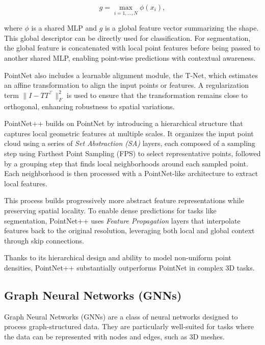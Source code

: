 \documentclass[%
 reprint,
 amsmath,amssymb,
 aps,
 floatfix,
 nofootinbib,
]{revtex4-2}
\begin{document}
\vspace{-0.35cm}

\[
g = \max_{i=1,\dots,N} \phi(x_i),
\]

\vspace{-0.1cm}

where \( \phi \) is a shared MLP and \( g \) is a global feature vector summarizing the shape. This global descriptor can be directly used for classification. For segmentation, the global feature is concatenated with local point features before being passed to another shared MLP, enabling point-wise predictions with contextual awareness.

PointNet also includes a learnable alignment module, the T-Net, which estimates an affine transformation to align the input points or features. A regularization term \( \| I - T T^\top \|_F^2 \) is used to ensure that the transformation remains close to orthogonal, enhancing robustness to spatial variations.

\vspace{0.2cm}

PointNet++ builds on PointNet by introducing a hierarchical structure that captures local geometric features at multiple scales. It organizes the input point cloud using a series of \textit{Set Abstraction (SA)} layers, each composed of a sampling step using Farthest Point Sampling (FPS) to select representative points, followed by a grouping step that finds local neighborhoods around each sampled point. Each neighborhood is then processed with a PointNet-like architecture to extract local features.

This process builds progressively more abstract feature representations while preserving spatial locality. To enable dense predictions for tasks like segmentation, PointNet++ uses \textit{Feature Propagation} layers that interpolate features back to the original resolution, leveraging both local and global context through skip connections.

Thanks to its hierarchical design and ability to model non-uniform point densities, PointNet++ substantially outperforms PointNet in complex 3D tasks.


\subsection{Graph Neural Networks (GNNs)}

Graph Neural Networks (GNNs) are a class of neural networks designed to process graph-structured data. They are particularly well-suited for tasks where the data can be represented with nodes and edges, such as 3D meshes.
\end{document}
